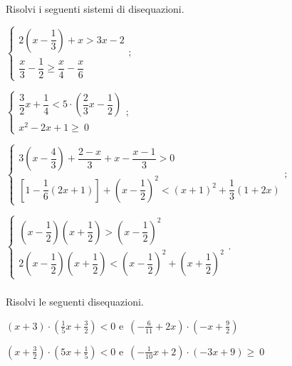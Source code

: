 \begin{esercizio}[\Ast]
 \label{ese:21.41}
 Risolvi i seguenti sistemi di disequazioni.

 \begin{enumeratea}
 \item {\longarray $\left\{\begin{array}{l}
  2\left(x-\dfrac{1}{3}\right)+x>3x-2\\
        \dfrac{x}{3}-\dfrac{1}{2}\ge \dfrac{x}{4}-\dfrac{x}{6}
   \end{array}\right.;$}
\item $\left\{\begin{array}{l}
    \dfrac{3}{2}x+\dfrac{1}{4}<5\cdot\left(\dfrac{2}{3}x-\dfrac{1}{2}\right)\\
    x^2-2x+1\ge~0
   \end{array}\right.;$
\item {\longarray $\left\{\begin{array}{l}
  3\left(x-\dfrac{4}{3}\right)+\dfrac{2-x}{3}+x-\dfrac{x-1}{3}>0\\
        \left[1-\dfrac{1}{6}(2x+1)\right]+\left(x-\dfrac{1}{2}\right)^{2}<(x+1)^{2}+\dfrac{1}{3}(1+2x)
   \end{array}\right.;$}
\item {\longarray $\left\{\begin{array}{l}
        \left(x-\dfrac{1}{2}\right)\left(x+\dfrac{1}{2}\right)>\left(x-\dfrac{1}{2}\right)^{2}\\
  2\left(x-\dfrac{1}{2}\right)\left(x+\dfrac{1}{2}\right)<\left(x-\dfrac{1}{2}\right)^{2}+\left(x+\dfrac{1}{2}\right)^{2}
   \end{array}\right..$}
 \end{enumeratea}
\end{esercizio}

\subsubsection*{}

\begin{esercizio}
 \label{ese:21.42}
 Risolvi le seguenti disequazioni.

\begin{enumeratea}
\item $(x+3)\cdot \left(\frac{1}{5}x+\frac{3}{2}\right)<0$ e~$\left(-{\frac{6}{11}}+2x\right)\cdot\left(-x+\frac{9}{2}\right)$
\item $\left(x+\frac{3}{2}\right)\cdot \left(5x+\frac{1}{5}\right)<0$ e~$\left(-{\frac{1}{10}}x+2\right)\cdot \left(-3x+9\right)\ge~0$
\end{enumeratea}

\end{esercizio}


